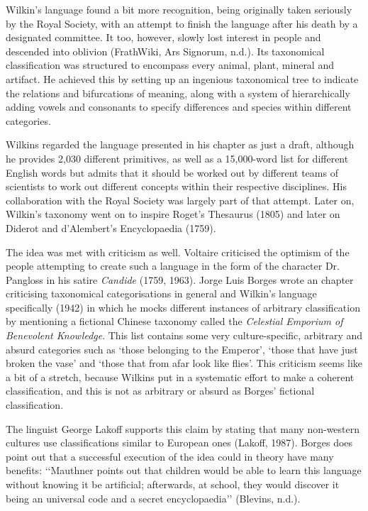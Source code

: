 Wilkin’s language found  a bit more recognition, being originally taken seriously by the Royal Society, with an attempt to finish the language after his death by a designated committee. It too, however, slowly lost interest in people and descended into oblivion  (FrathWiki, Ars Signorum, n.d.). Its taxonomical classification was structured to encompass every animal, plant, mineral and artifact. He achieved this by setting up an ingenious taxonomical tree to indicate the relations and bifurcations of meaning, along with a system of hierarchically adding vowels and consonants to specify differences and species within different categories. 

Wilkins regarded the language presented in his chapter as just a draft, although he provides 2,030 different primitives, as well as a 15,000-word list for different English words but admits that it should be worked out by different teams of scientists to work out different concepts within their respective disciplines. His collaboration with the Royal Society was largely part of that attempt. Later on, Wilkin’s taxonomy went on to inspire Roget’s Thesaurus (1805) and later on Diderot and d’Alembert’s Encyclopaedia (1759).  

The idea was met with criticism as well. Voltaire criticised the optimism of the people attempting to create such a language in the form of the character Dr. Pangloss in his satire \textit{Candide} (1759, 1963). Jorge Luis Borges wrote an chapter criticising taxonomical categorisations in general and Wilkin’s language specifically (1942) in which he mocks different instances of arbitrary classification by mentioning a fictional Chinese taxonomy called the \textit{Celestial Emporium of Benevolent Knowledge}. This list contains some very culture-specific, arbitrary and absurd categories such as ‘those belonging to the Emperor’, ‘those that have just broken the vase’ and ‘those that from afar look like flies’. This criticism seems like a bit of a stretch, because Wilkins put in a systematic effort to make a coherent classification, and this is not as arbitrary or absurd as Borges’ fictional classification. 

The linguist George Lakoff supports this claim by stating that many non-western cultures use classifications similar to European ones (Lakoff, 1987). Borges does point out that a successful execution of the idea could in theory have many benefits: ‘‘Mauthner points out that children would be able to learn this language without knowing it be artificial; afterwards, at school, they would discover it being an universal code and a secret encyclopaedia’’ (Blevins, n.d.). 

